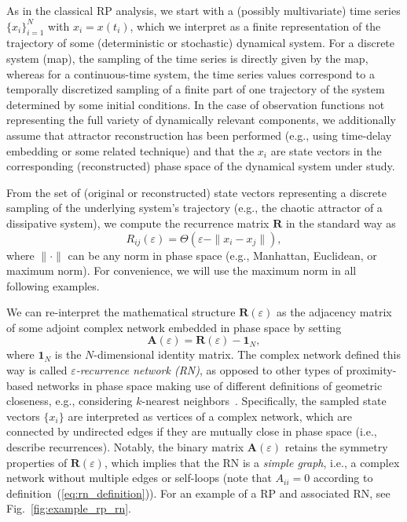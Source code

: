 \documentclass[graybox]{svmult}
\begin{document}
As in the classical RP analysis, we start with a (possibly multivariate) time series $\{x_i\}_{i=1}^N$ with $x_i=x(t_i)$, which we interpret as a finite representation of the trajectory of some (deterministic or stochastic) dynamical system. For a discrete system (map), the sampling of the time series is directly given by the map, whereas for a continuous-time system, the time series values correspond to a temporally discretized sampling of a finite part of one trajectory of the system determined by some initial conditions. In the case of observation functions not representing the full variety of dynamically relevant components, we additionally assume that attractor reconstruction has been performed (e.g., using time-delay embedding or some related technique) \cite{Fraser1986,kantz1997,Kennel1992,Takens1981} and that the $x_i$ are state vectors in the corresponding (reconstructed) phase space of the dynamical system under study. 

From the set of (original or reconstructed) state vectors representing a discrete sampling of the underlying system's trajectory (e.g., the chaotic attractor of a dissipative system), we compute the recurrence matrix $\textbf{R}$ in the standard way \cite{Eckmann1987,marwan2007} as
\begin{equation}
R_{ij}(\varepsilon)=\Theta(\varepsilon-\|x_i-x_j\|),
\end{equation}
\noindent
where $\|\cdot\|$ can be any norm in phase space (e.g., Manhattan, Euclidean, or maximum norm). For convenience, we will use the maximum norm in all following examples.

We can re-interpret the mathematical structure $\textbf{R}(\varepsilon)$ as the adjacency matrix of some adjoint complex network embedded in phase space by setting
\begin{equation}
\mathbf{A}(\varepsilon)=\mathbf{R}(\varepsilon)-\mathbf{1}_N,
\label{eq:rn_definition}
\end{equation}
\noindent
where $\mathbf{1}_N$ is the $N$-dimensional identity matrix. The complex network defined this way is called \emph{$\varepsilon$-recurrence network (RN)}, as opposed to other types of proximity-based networks in phase space making use of different definitions of geometric closeness, e.g., considering $k$-nearest neighbors~\cite{Donner2011IJBC}. Specifically, the sampled state vectors $\{x_i\}$ are interpreted as vertices of a complex network, which are connected by undirected edges if they are mutually close in phase space (i.e., describe recurrences). Notably, the binary matrix $\mathbf{A}(\varepsilon)$ retains the symmetry properties of $\mathbf{R}(\varepsilon)$, which implies that the RN is a \emph{simple graph}, i.e., a complex network without multiple edges or self-loops (note that $A_{ii}=0$ according to definition~(\ref{eq:rn_definition})). For an example of a RP and associated RN, see Fig.~\ref{fig:example_rp_rn}. 
\end{document}
